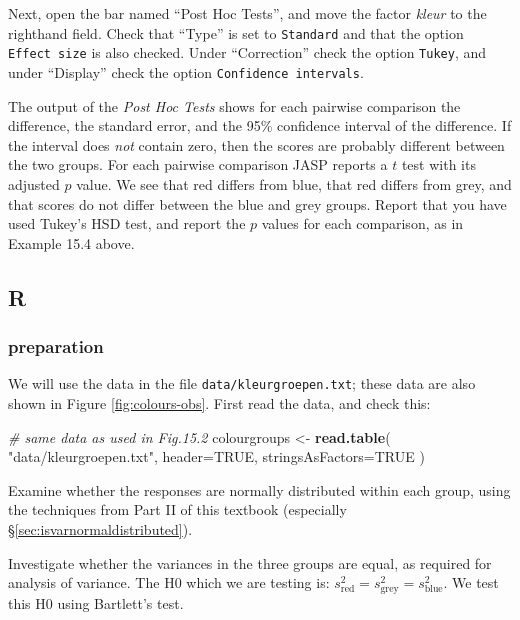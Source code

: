 \documentclass[
]{book}
\newenvironment{Shaded}{\begin{snugshade}}{\end{snugshade}}
\newcommand{\CommentTok}[1]{\textcolor[rgb]{0.56,0.35,0.01}{\textit{#1}}}
\newcommand{\DataTypeTok}[1]{\textcolor[rgb]{0.13,0.29,0.53}{#1}}
\newcommand{\KeywordTok}[1]{\textcolor[rgb]{0.13,0.29,0.53}{\textbf{#1}}}
\newcommand{\NormalTok}[1]{#1}
\newcommand{\OtherTok}[1]{\textcolor[rgb]{0.56,0.35,0.01}{#1}}
\newcommand{\StringTok}[1]{\textcolor[rgb]{0.31,0.60,0.02}{#1}}
\begin{document}
Next, open the bar named ``Post Hoc Tests'', and move the factor \emph{kleur} to the righthand field.
Check that ``Type'' is set to \texttt{Standard} and that the option \texttt{Effect\ size} is also checked.
Under ``Correction'' check the option \texttt{Tukey}, and under ``Display'' check the option \texttt{Confidence\ intervals}.

The output of the \emph{Post Hoc Tests} shows for each pairwise comparison the difference, the standard error, and the 95\% confidence interval of the difference. If the interval does \emph{not} contain zero, then the scores are probably different between the two groups. For each pairwise comparison JASP reports a \(t\) test with its adjusted \(p\) value. We see that red differs from blue, that red differs from grey, and that scores do not differ between the blue and grey groups. Report that you have used Tukey's HSD test, and report the \(p\) values for each comparison, as in Example 15.4 above.

\hypertarget{r-14}{%
\subsection{R}\label{r-14}}

\hypertarget{preparation-2}{%
\subsubsection{preparation}\label{preparation-2}}

We will use the data in the file \texttt{data/kleurgroepen.txt}; these data are also shown in Figure \ref{fig:colours-obs}. First read the data, and check this:

\begin{Shaded}
\begin{Highlighting}[]
\CommentTok{\# same data as used in Fig.15.2}
\NormalTok{colourgroups \textless{}{-}}\StringTok{ }\KeywordTok{read.table}\NormalTok{( }\StringTok{"data/kleurgroepen.txt"}\NormalTok{, }
                            \DataTypeTok{header=}\OtherTok{TRUE}\NormalTok{, }\DataTypeTok{stringsAsFactors=}\OtherTok{TRUE}\NormalTok{ )}
\end{Highlighting}
\end{Shaded}

Examine whether the responses are normally distributed within each group, using
the techniques from Part II of this textbook (especially
§\ref{sec:isvarnormaldistributed}).

Investigate whether the variances in the three groups are equal, as required
for analysis of variance. The H0 which we are testing is:
\(s^2_\textrm{red} = s^2_\textrm{grey} = s^2_\textrm{blue}\). We
test this H0 using Bartlett's test.
\end{document}
